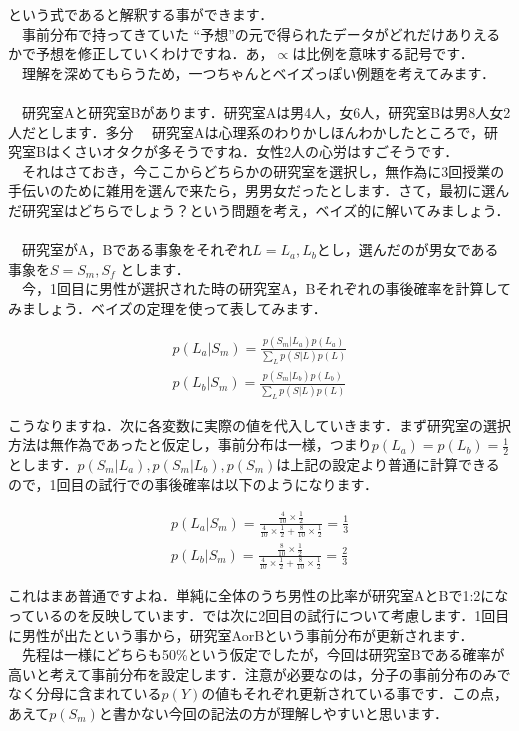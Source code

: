 \documentclass[11pt,a4paper,uplatex]{ujreport} 	%
\begin{document}
という式であると解釈する事ができます．\\
　事前分布で持ってきていた ``予想''の元で得られたデータがどれだけありえるかで予想を修正していくわけですね．あ，$\propto$は比例を意味する記号です．\\
　理解を深めてもらうため，一つちゃんとベイズっぽい例題を考えてみます．\\
\\
　研究室Aと研究室Bがあります．研究室Aは男4人，女6人，研究室Bは男8人女2人だとします．多分
　研究室Aは心理系のわりかしほんわかしたところで，研究室Bはくさいオタクが多そうですね．女性2人の心労はすごそうです．\\
　それはさておき，今ここからどちらかの研究室を選択し，無作為に3回授業の手伝いのために雑用を選んで来たら，男男女だったとします．さて，最初に選んだ研究室はどちらでしょう？という問題を考え，ベイズ的に解いてみましょう．\\
  \\
　研究室がA，Bである事象をそれぞれ$L=L_a, L_b$とし，選んだのが男女である事象を$S=S_m, S_f$
とします．\\
　今，1回目に男性が選択された時の研究室A，Bそれぞれの事後確率を計算してみましょう．ベイズの定理を使って表してみます．
  
\begin{align}
p(L_a | S_m) = \frac{p(S_m|L_a)p(L_a)}{\sum_L p(S|L)p(L)}\\
p(L_b | S_m) = \frac{p(S_m | L_b)p(L_b)}{\sum_L p(S|L)p(L)}
\end{align}

こうなりますね．次に各変数に実際の値を代入していきます．まず研究室の選択方法は無作為であったと仮定し，事前分布は一様，つまり$p(L_a)=p(L_b)=\frac{1}{2}$とします．$p(S_m|L_a), p(S_m|L_b), p(S_m)$は上記の設定より普通に計算できるので，1回目の試行での事後確率は以下のようになります．

\begin{align}
p(L_a | S_m) = \frac{\frac{4}{10} \times \frac{1}{2}}{ \frac{4}{10}\times \frac{1}{2} + \frac{8}{10}\times \frac{1}{2}} = \frac{1}{3}\\
p(L_b | S_m) = \frac{\frac{8}{10} \times \frac{1}{2}}{ \frac{4}{10}\times \frac{1}{2} + \frac{8}{10}\times \frac{1}{2}} = \frac{2}{3}
\end{align}

これはまあ普通ですよね．単純に全体のうち男性の比率が研究室AとBで1:2になっているのを反映しています．では次に2回目の試行について考慮します．1回目に男性が出たという事から，研究室AorBという事前分布が更新されます．\\
　先程は一様にどちらも50\%という仮定でしたが，今回は研究室Bである確率が高いと考えて事前分布を設定します．注意が必要なのは，分子の事前分布のみでなく分母に含まれている$p(Y)$の値もそれぞれ更新されている事です．この点，あえて$p(S_m)$と書かない今回の記法の方が理解しやすいと思います．
\end{document}
